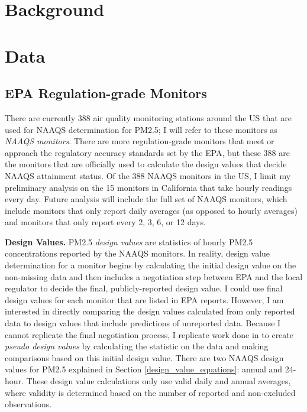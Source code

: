 \documentclass[12pt]{article}
\begin{document}
\section{Background} 
\label{background}






\section{Data} \label{data}


\subsection{EPA Regulation-grade Monitors}
There are currently 388 air quality monitoring stations around the US that are used for NAAQS determination for PM2.5; I will refer to these monitors as \textit{NAAQS monitors}. There are more regulation-grade monitors that meet or approach the regulatory accuracy standards set by the EPA, but these 388 are the monitors that are officially used to calculate the design values that decide NAAQS attainment status. Of the 388 NAAQS monitors in the US, I limit my preliminary analysis on the 15 monitors in California that take hourly readings every day. Future analysis will include the full set of NAAQS monitors, which include monitors that only report daily averages (as opposed to hourly averages) and monitors that only report every 2, 3, 6, or 12 days.

\textbf{Design Values.} PM2.5 \textit{design values} are statistics of hourly PM2.5 concentrations reported by the NAAQS monitors. In reality, design value determination for a monitor begins by calculating the initial design value on the non-missing data and then includes a negotiation step between EPA and the local regulator to decide the final, publicly-reported design value. I could use final design values for each monitor that are listed in EPA reports. However, I am interested in directly comparing the design values calculated from only reported data to design values that include predictions of unreported data. Because I cannot replicate the final negotiation process, I replicate work done in \citep{fowlieBringingSatelliteBasedAir2019} to create \textit{pseudo design values} by calculating the statistic on the data and making comparisons based on this initial design value. There are two NAAQS design values for PM2.5 explained in Section \ref{design_value_equations}: annual and 24-hour. These design value calculations only use valid daily and annual averages, where validity is determined based on the number of reported and non-excluded observations.
\end{document}
